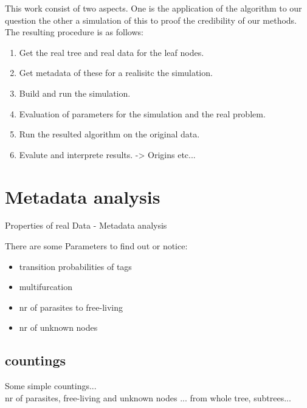   This work consist of two aspects. One is the application of the algorithm to our question the
    other a simulation of this to proof the credibility of our methods. \\
  The resulting procedure is as follows:
  \begin{enumerate}
    \item Get the real tree and real data for the leaf nodes.
    \item Get metadata of these for a realisitc the simulation.
    \item Build and run the simulation.
    \item Evaluation of parameters for the simulation and the real problem.
    \item Run the resulted algorithm on the original data.
    \item Evalute and interprete results. -> Origins etc...
  \end{enumerate}
  

  
  \section{Metadata analysis}
    Properties of real Data - Metadata analysis

    There are some Parameters to find out or notice:
    \begin{itemize}
      \item transition probabilities of tags
      \item multifurcation
      \item nr of parasites to free-living
      \item nr of unknown nodes 
    \end{itemize}

    \subsection{countings}
      Some simple countings...\\
      nr of parasites, free-living and unknown nodes ... from whole tree, subtrees...

